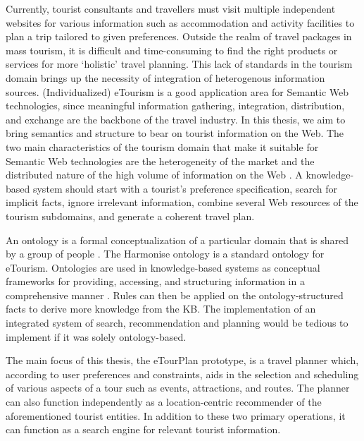 \hspace{0.3in}Currently, tourist consultants and travellers must visit multiple independent websites for various information such as accommodation and activity facilities to plan a trip tailored to given preferences. Outside the realm of travel packages in mass tourism, it is difficult and time-consuming to find the right products or services for more `holistic' travel planning. This lack of standards in the tourism domain brings up the necessity of integration of heterogenous information sources. (Individualized) eTourism is a good application area for Semantic Web technologies, since meaningful information gathering, integration, distribution, and exchange are the backbone of the travel industry. In this thesis, we aim to bring semantics and structure to bear on tourist information on the Web. The two main characteristics of the tourism domain that make it suitable for Semantic Web technologies are the heterogeneity of the market and the distributed nature of the high volume of information on the Web \cite{deri:04}. A knowledge-based system should start with a tourist's preference specification, search for implicit facts, ignore irrelevant information, combine several Web resources of the tourism subdomains, and generate a coherent travel plan.
 
\hspace{0.3in}An ontology is a formal conceptualization of a particular domain that is shared by a group of people \cite{gruber93towards}. The Harmonise ontology \cite{MM:02} is a standard ontology for eTourism. Ontologies are used in knowledge-based systems as conceptual frameworks for providing, accessing, and structuring information in a comprehensive manner \cite{AS:02}. Rules can then be applied on the ontology-structured facts to derive more knowledge from the KB. The implementation of an integrated system of search, recommendation and planning would be tedious to implement if it was solely ontology-based.

\hspace{0.3in}The main focus of this thesis, the eTourPlan prototype, is a travel planner which, according to user preferences and constraints, aids in the selection and scheduling of various aspects of a tour such as events, attractions, and routes. The planner can also function independently as a location-centric recommender of the aforementioned tourist entities. In addition to these two primary operations, it can function as a search engine for relevant tourist information.

